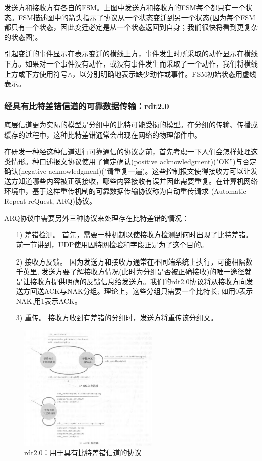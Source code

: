     发送方和接收方有各自的FSM。上图中发送方和接收方的FSM每个都只有一个状态。FSM描述图中的箭头指示了协议从一个状态变迁到另一个状态(因为每个FSM都只有一个状态，因此变迁必定是从一个状态返回到自身；我们很快将看到更复杂的状态图)。

    引起变迁的事件显示在表示变迁的横线上方，事件发生时所采取的动作显示在横线下方。如果对一个事件没有动作，或没有事件发生而采取了一个动作，我们将横线上方或下方使用符号$\land$，以分别明确地表示缺少动作或事件。FSM初始状态用虚线表示。

\subsubsection{经具有比特差错信道的可靠数据传输：rdt2.0}

    底层信道更为实际的模型是分组中的比特可能受损的模型。在分组的传输、传播或缓存的过程中，这种比特差错通常会岀现在网络的物理部件中。

    在研发一种经这种信道进行可靠通信的协议之前，首先考虑一下人们会怎样处理这类情形。种口述报文协议使用了肯定确认(positive acknowledgment)("OK”)与否定确认(negative acknowledgmenl)("请重复一遍)。这些控制报文使得接收方可以让发送方知道哪些内容被正确接收，哪些内容接收有误并因此需要重复。在计算机网络环境中，基于这样重传机制的可靠数据传输协议称为自动重传请求 (Automatic Repeat reQuest, ARQ)协议。

    ARQ协议中需要另外三种协议来处理存在比特差错的情况：

\begin{itemize}
    \item [1)] 差错检测。
    \subitem 首先，需要一种机制以使接收方检测到何时出现了比特差错。前一节讲到，UDP使用因特网检验和字段正是为了这个目的。
    \item [2)] 接收方反馈。
    \subitem 因为发送方和接收方通常在不同端系统上执行，可能相隔数千英里, 发送方要了解接收方情况(此时为分组是否被正确接收)的唯一途径就是让接收方提供明确的反馈信息给发送方。我们的rdt2.0协议将从接收方向发送方回送ACK与NAK分组。理论上，这些分组只需要一个比特长; 如用0表示NAK,用1表示ACK。
    \item [3)] 重传。
    \subitem 接收方收到有差错的分组时，发送方将重传该分组文。
\end{itemize}

\begin{figure}[!htbp]
    \centering
    \includegraphics[width=0.6\textwidth]{image/chapter03/rdt2.0-具有比特差错的机制.png}
    \caption{rdt2.0：用于具有比特差错信道的协议}
\end{figure}

